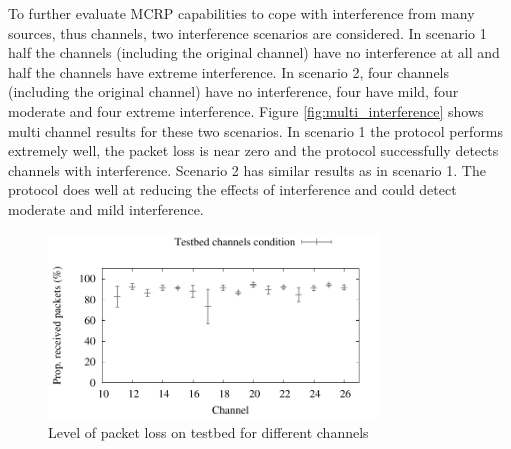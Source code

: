 


To further evaluate MCRP capabilities to cope with interference from many sources, thus channels, two interference scenarios are considered.
In scenario 1 half the channels (including the original channel) have no
interference at all and half the channels have extreme interference.
In scenario 2, four channels (including the original channel) have no
interference, four have mild, four moderate and four extreme interference.
Figure \ref{fig:multi_interference} shows multi channel results for these
two scenarios. In scenario 1 the protocol performs extremely well, the packet loss is near zero and the protocol successfully detects channels with interference.
Scenario 2 has similar results as in scenario 1. The protocol does well at reducing the effects of interference and could detect moderate and mild interference.

\begin{figure}
\centering
\includegraphics[width=0.78\textwidth]{experiments/chCondition.pdf}
\caption{Level of packet loss on testbed for different channels}
\label{fig:chCondition_testbed}
\end{figure}

